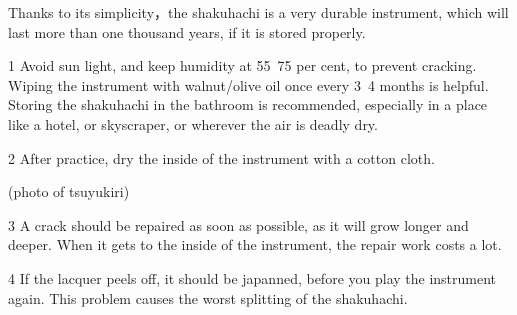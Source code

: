 ﻿Thanks to its simplicity，the shakuhachi is a very durable instrument, which will last more than one thousand years, if it is stored properly. 

\par

1  Avoid sun light, and keep humidity at 55~75 per cent, to prevent cracking.\\
   Wiping the instrument with walnut/olive oil once every 3~4 months is helpful.\\
   Storing the shakuhachi in the bathroom is recommended, especially in a place like a hotel, or skyscraper, or wherever the air is deadly dry. 

\par

2  After practice, dry the inside of the instrument with a cotton cloth.

\par
               
   (photo of tsuyukiri) 

\par

3  A crack should be repaired as soon as possible, as it will grow longer and deeper.
   When it gets to the inside of the instrument, the repair work costs a lot.

\par

4  If the lacquer peels off, it should be japanned, before you play the 
   instrument again. This problem causes the worst splitting of the shakuhachi.

\vfill*


	
